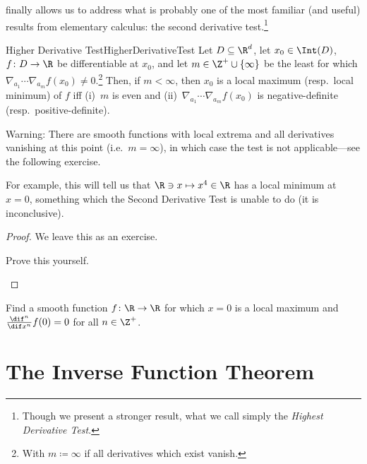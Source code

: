  finally allows us to address what is probably one of the most familiar (and useful) results from elementary calculus:  the second derivative test.\footnote{Though we present a stronger result, what we call simply the \emph{Highest Derivative Test}.}
\begin{thm}{Higher Derivative Test}{HigherDerivativeTest}
Let $D\subseteq \R ^d$, let $x_0\in \Int (D)$, $f\colon D\rightarrow \R$ be differentiable at $x_0$, and let $m\in \Z ^+\cup \{ \infty \}$ be the least for which $\nabla _{a_1}\cdots \nabla _{a_m}f(x_0)\neq 0$.\footnote{With $m\coloneqq \infty$ if all derivatives which exist vanish.}  Then, if $m<\infty$, then $x_0$ is a local maximum (resp.~local minimum) of $f$ iff (i)~$m$ is even and (ii)~$\nabla _{a_1}\cdots \nabla _{a_m}f(x_0)$ is negative-definite (resp.~positive-definite).
\begin{wrn}
Warning:  There are smooth functions with local extrema and all derivatives vanishing at this point (i.e.~$m=\infty$), in which case the test is not applicable---see the following exercise.
\end{wrn}
\begin{rmk}
For example, this will tell us that $\R \ni x\mapsto x^4\in \R$ has a local minimum at $x=0$, something which the Second Derivative Test is unable to do (it is inconclusive).
\end{rmk}
\begin{proof}
We leave this as an exercise.
\begin{exr}[breakable=false]{}{}
Prove this yourself.
\end{exr}
\end{proof}
\end{thm}
\begin{exr}{}{}
Find a smooth function $f\colon \R \rightarrow \R$ for which $x=0$ is a local maximum and $\frac{\dif ^n}{\dif x^n}f(0)=0$ for all $n\in \Z ^+$.
\end{exr}

\section{The Inverse Function Theorem}

